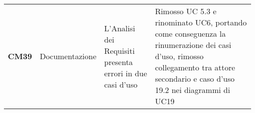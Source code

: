 \documentclass[../piano-di-qualifica.tex]{subfiles}
\begin{document}
\begin{longtable}[H]{>{\centering\bfseries}m{2.5cm} >{\centering}m{2.5cm} >{\centering}m{5.5cm} >{\centering\arraybackslash}m{5.5cm}}
CM39 & Documentazione                                & L’Analisi dei Requisiti presenta errori in due casi d’uso                                                                                                                     & Rimosso UC 5.3 e rinominato UC6, portando come conseguenza la rinumerazione dei casi d’uso, rimosso collegamento tra attore secondario e caso d’uso 19.2  nei diagrammi di UC19                                                                                                                                                                     \\

\end{longtable}
\end{document}
